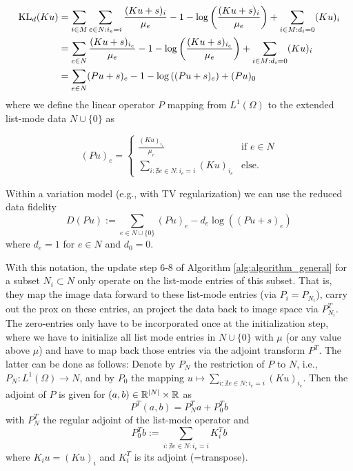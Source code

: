 \documentclass{article}
\begin{document}
\begin{align*}
\operatorname{KL}_d(Ku) 
& = \sum_{i \in M} \sum_{e \in N: i_e = i} \frac{(Ku + s)_i}{\mu_{e}} - 1 - \log \left(\frac{(Ku + s)_i}{\mu_{e}} \right) + \sum_{i \in M: d_i = 0} (Ku)_i  \\
& =  \sum_{e \in N} \frac{(Ku+s)_{i_e}}{\mu_{e}} - 1 - \log \left(\frac{(Ku+s)_{i_e}}{\mu_{e}} \right)
+ \sum_{i \in M: d_i = 0} (Ku)_i \\ 
& = \sum_{e \in N} (Pu+s)_e - 1 - \log \left((Pu+s)_e \right)
+ (Pu)_0
\end{align*}
where we define the linear operator $P$ mapping from $L^1(\Omega)$ to the extended list-mode data $N \cup \{0\}$ as

\[ (Pu) _e = \begin{cases}
 \frac{(Ku)_{i_e}}{\mu_e} & \text{if } e \in N \\
 \sum_{i: \nexists e \in N: i_e = i} (Ku)_{i_e} & \text{else.}
\end{cases}
\]


Within a variation model (e.g., with TV regularization) we can use the reduced data fidelity
\[ D(Pu):= \sum_{e \in N \cup \{ 0 \}} (Pu)_e - d_e \log ( (Pu+s)_e) \]
where $d_e = 1$ for $e \in N$ and $d_0 = 0$. 

With this notation, the update step 6-8 of Algorithm \ref{alg:algorithm_general} for a subset $N_i \subset N$ only operate on the list-mode entries of this subset. That is, they map the image data forward to these list-mode entries (via $P_i= P_{N_i}$), carry out the prox on these entries, an project the data back to image space via $P_{N_i}^T$. The zero-entries only have to be incorporated once at the initialization step, where we have to initialize all list mode entries in $N \cup \{ 0\}$ with $\mu$ (or any value above $\mu$) and have to map back those entries via the adjoint transform $P^T$.
The latter can be done as follows: Denote by $P_N$ the restriction of $P$ to $N$, i.e., $P_N:L^1(\Omega) \rightarrow N$, and by $P_0$ the mapping $u \mapsto \sum_{i: \nexists e \in N: i_e = i} (Ku)_{i_e}$. Then the adjoint of $P$ is given for $(a,b) \in \mathbb{R}^{|N|} \times \mathbb{R}$  as
\[ P^T(a,b) = P_N^T a + P_0^T b \]
with $P_N^T$ the regular adjoint of the list-mode operator and 
\[ P_0^Tb:= \sum_{i: \nexists e \in N: i_e = i} K_i^T b
\]
where $K_iu = (Ku)_i$ and $K_i^T$ is its adjoint (=transpose).






\end{document}
